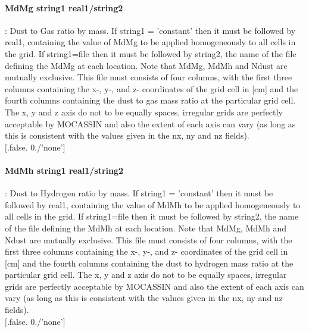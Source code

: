 \documentclass[11pt]{article}
\begin{document}
\paragraph    {MdMg string1 real1/string2 }: Dust to Gas ratio by mass. If string1 = 'constant' then
                     it must be followed by real1, containing the value of MdMg to be applied 
                     homogeneously to all cells in the grid. If string1=file then it must be 
                     followed by string2, the name of the file defining the MdMg at each 
                     location. Note that MdMg, MdMh and Ndust are mutually exclusive.
                     This file must consists of four columns, with the first three 
		     columns containing the x-, y-, and z- coordinates of the grid cell in 
		     [cm] and the fourth columns containing the dust to gas mass ratio
                     at the particular grid cell. The 
		     x, y and z axis do not to be equally spaces, irregular grids are 
		     perfectly acceptable by MOCASSIN and also the extent of each axis 
		     can vary (as long as this is consistent with the values given in 
		     the nx, ny and nz fields).\\
		     $[$.false. 0./'none'$]$\\

\paragraph    {MdMh string1 real1/string2} : Dust to Hydrogen ratio by mass. If string1 = 'constant' then
                     it must be followed by real1, containing the value of MdMh to be applied 
                     homogeneously to all cells in the grid. If string1=file then it must be 
                     followed by string2, the name of the file defining the MdMh at each 
                     location. Note that MdMg, MdMh and Ndust are mutually exclusive. 
                     This file must consists of four columns, with the first three 
		     columns containing the x-, y-, and z- coordinates of the grid cell in 
		     [cm] and the fourth columns containing the dust to hydrogen mass ratio
                     at the particular grid cell. The 
		     x, y and z axis do not to be equally spaces, irregular grids are 
		     perfectly acceptable by MOCASSIN and also the extent of each axis 
		     can vary (as long as this is consistent with the values given in 
		     the nx, ny and nz fields).\\
		     $[$.false. 0./'none'$]$\\
\end{document}
